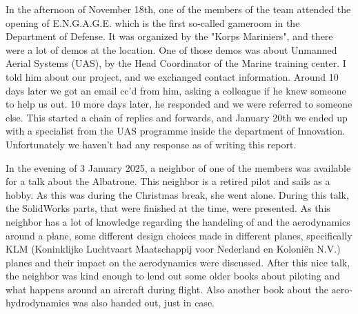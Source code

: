 In the afternoon of November 18th, one of the members of the team attended the opening of E.N.G.A.G.E. which is the first so-called gameroom in the Department of Defense. It was organized by the "Korps Mariniers", and there were a lot of demos at the location. One of those demos was about Unmanned Aerial Systems (UAS), by the Head Coordinator of the Marine training center. I told him about our project, and we exchanged contact information. Around 10 days later we got an email cc'd from him, asking a colleague if he knew someone to help us out. 10 more days later, he responded and we were referred to someone else. This started a chain of replies and forwards, and January 20th we ended up with a specialist from the UAS programme inside the department of Innovation. Unfortunately we haven't had any response as of writing this report.

In the evening of 3 January 2025, a neighbor of one of the members was available for a talk about the Albatrone. This neighbor is a retired pilot and sails as a hobby. As this was during the Christmas break, she went alone. During this talk, the SolidWorks parts, that were finished at the time, were presented. As this neighbor has a lot of knowledge regarding the handeling of and the aerodynamics around a plane, some different design choices made in different planes, specifically KLM (Koninklijke Luchtvaart Maatschappij voor Nederland en Koloniën N.V.) planes and their impact on the aerodynamics were discussed. After this nice talk, the neighbor was kind enough to lend out some older books about piloting and what happens around an aircraft during flight. Also another book about the aero-hydrodynamics was also handed out, just in case.